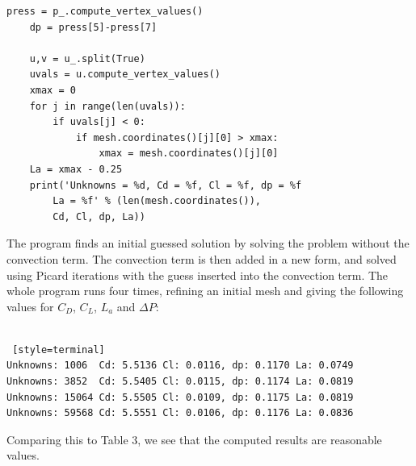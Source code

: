 \documentclass[a4paper,english,11pt,twoside]{article}
\begin{document}
\begin{lstlisting}[style=python]
	press = p_.compute_vertex_values()
	dp = press[5]-press[7]

	u,v = u_.split(True)
	uvals = u.compute_vertex_values()
	xmax = 0
	for j in range(len(uvals)):
		if uvals[j] < 0:
			if mesh.coordinates()[j][0] > xmax:
				xmax = mesh.coordinates()[j][0]
	La = xmax - 0.25
	print('Unknowns = %d, Cd = %f, Cl = %f, dp = %f 
		La = %f' % (len(mesh.coordinates()), 
		Cd, Cl, dp, La))
\end{lstlisting}

The program finds an initial guessed solution by solving the problem without the convection term. The convection term is then added in a new form, and solved using Picard iterations with the guess inserted into the convection term. The whole program runs four times, refining an initial mesh and giving the following values for $C_D$, $C_L$, $L_a$ and $\Delta P$:\\
\\
\begin{lstlisting} [style=terminal]
Unknowns: 1006  Cd: 5.5136 Cl: 0.0116, dp: 0.1170 La: 0.0749
Unknowns: 3852  Cd: 5.5405 Cl: 0.0115, dp: 0.1174 La: 0.0819
Unknowns: 15064 Cd: 5.5505 Cl: 0.0109, dp: 0.1175 La: 0.0819
Unknowns: 59568 Cd: 5.5551 Cl: 0.0106, dp: 0.1176 La: 0.0836
\end{lstlisting}
Comparing this to Table 3, we see that the computed results are reasonable values.

\newpage
\end{document}

